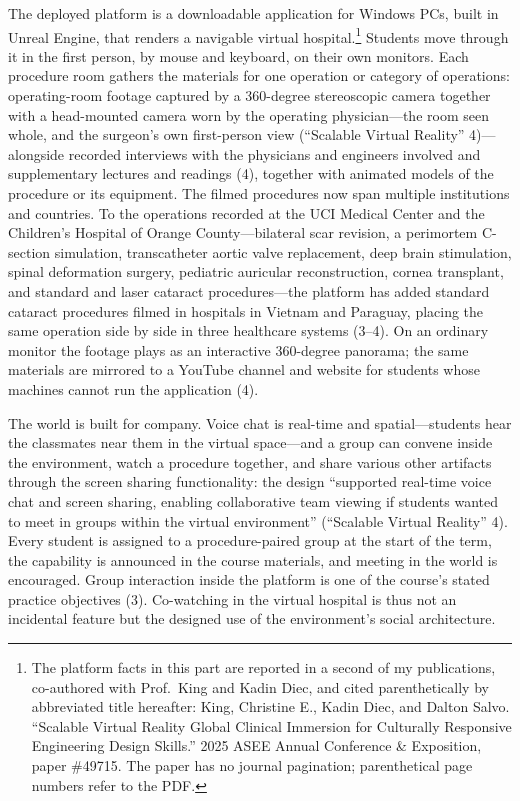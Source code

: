 The deployed platform is a downloadable application for Windows PCs, built in
Unreal Engine, that renders a navigable virtual hospital.\footnote{The platform
facts in this part are reported in a second of my publications, co-authored
with Prof.\ King and Kadin Diec, and cited parenthetically by abbreviated title
hereafter: King, Christine E., Kadin Diec, and Dalton Salvo. ``Scalable Virtual
Reality Global Clinical Immersion for Culturally Responsive Engineering Design
Skills.'' 2025 ASEE Annual Conference \& Exposition, paper \#49715.
The paper has no journal pagination; parenthetical page numbers refer to the
PDF.} Students move through it in the first person, by mouse and keyboard, on
their own monitors. Each procedure room gathers the materials for one
operation or category of operations: operating-room footage captured by a 360-degree stereoscopic camera
together with a head-mounted camera worn by the operating physician---the room
seen whole, and the surgeon's own first-person view (``Scalable Virtual
Reality'' 4)---alongside recorded interviews with the physicians and engineers
involved and supplementary lectures and readings (4), together with animated
models of the procedure or its equipment. The filmed procedures now
span multiple institutions and countries. To the operations recorded at the UCI
Medical Center and the Children's Hospital of Orange County---bilateral scar
revision, a perimortem C-section simulation, transcatheter aortic valve
replacement, deep brain stimulation, spinal deformation surgery, pediatric
auricular reconstruction, cornea transplant, and standard and laser cataract
procedures---the platform has added standard cataract procedures filmed in
hospitals in Vietnam and Paraguay, placing the same operation side by side in
three healthcare systems (3--4). On an ordinary monitor the footage plays as an interactive 360-degree
panorama; the same materials are mirrored to a YouTube channel and website for
students whose machines cannot run the application (4).

The world is built for company. Voice chat is real-time and spatial---students
hear the classmates near them in the virtual space---and a group can convene
inside the environment, watch a procedure together, and share various other
artifacts through the screen sharing functionality: the design ``supported
real-time voice chat and screen sharing, enabling collaborative team viewing if
students wanted to meet in groups within the virtual environment'' (``Scalable
Virtual Reality'' 4). Every
student is assigned to a procedure-paired group at the start of the term, the
capability is announced in the course materials, and meeting in the world is
encouraged. Group interaction inside the platform is one of the course's stated
practice objectives (3). Co-watching in the virtual hospital is thus not an
incidental feature but the designed use of the environment's social
architecture.

